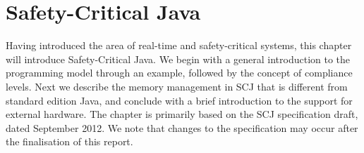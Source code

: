 \chapter{Safety-Critical Java}
\label{chapter:scj}
Having introduced the area of real-time and safety-critical systems, this chapter will introduce Safety-Critical Java. We begin with a general introduction to the programming model through an example, followed by the concept of compliance levels. Next we describe the memory management in SCJ that is different from standard edition Java, and conclude with a brief introduction to the support for external hardware.
 The chapter is primarily based on the SCJ specification draft, dated September 2012\cite{SCJSpec}. We note that changes to the specification may occur after the finalisation of this report.